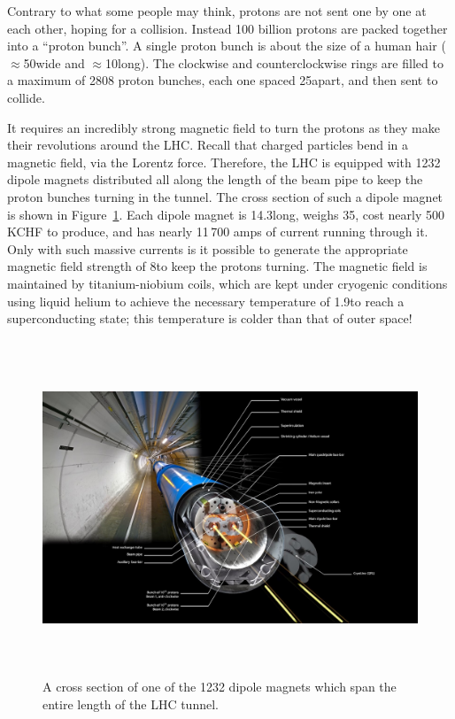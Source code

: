 Contrary to what some people may think, protons are not sent one by one at each other, hoping for a collision.
Instead 100 billion protons are packed together into a ``proton bunch''.
A single proton bunch is about the size of a human hair ($\approx$50\mum wide and $\approx$10\cm long). 
The clockwise and counterclockwise rings are filled to a maximum of 2808 proton bunches, each one spaced 25\ns apart, and then sent to collide. 

It requires an incredibly strong magnetic field to turn the protons as they make their revolutions around the LHC. 
Recall that charged particles bend in a magnetic field, via the Lorentz force. 
Therefore, the LHC is equipped with 1232 dipole magnets distributed all along the length of the beam pipe to keep the proton bunches turning in the tunnel.
The cross section of such a dipole magnet is shown in Figure~\ref{fig:lhc_dipole_xs}.
Each dipole magnet is 14.3\meter long, weighs 35\tonne, cost nearly 500\,KCHF to produce, and has nearly 11\,700 amps of current running through it. 
Only with such massive currents is it possible to generate the appropriate magnetic field strength of 8\tesla to keep the protons turning. 
The magnetic field is maintained by titanium-niobium coils, which are kept under cryogenic conditions using liquid helium to achieve the necessary temperature of 1.9\kelvin to reach a superconducting state; 
this temperature is colder than that of outer space!
\begin{figure}[pbth]
\centering
\includegraphics[width=15cm,height=10cm,keepaspectratio]{figures/lhc/lhc_dipole_xs.jpg}
    \caption{
    A cross section of one of the 1232 dipole magnets which span the entire length of the LHC tunnel.} 
    \label{fig:lhc_dipole_xs}
\end{figure}

